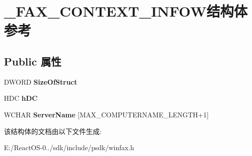 \hypertarget{struct___f_a_x___c_o_n_t_e_x_t___i_n_f_o_w}{}\section{\+\_\+\+F\+A\+X\+\_\+\+C\+O\+N\+T\+E\+X\+T\+\_\+\+I\+N\+F\+O\+W结构体 参考}
\label{struct___f_a_x___c_o_n_t_e_x_t___i_n_f_o_w}
\subsection*{Public 属性}
\begin{DoxyCompactItemize}
\item 
\mbox{\label{struct___f_a_x___c_o_n_t_e_x_t___i_n_f_o_w_aa58d932e8917d8bbe79fe3585bdc69f0}} 
D\+W\+O\+RD {\bfseries Size\+Of\+Struct}
\item 
\mbox{\label{struct___f_a_x___c_o_n_t_e_x_t___i_n_f_o_w_abdd87cba93df91e27694d1956846c2a6}} 
H\+DC {\bfseries h\+DC}
\item 
\mbox{\label{struct___f_a_x___c_o_n_t_e_x_t___i_n_f_o_w_a10fe4916ba711e5f9c926cdbfc0e6cc3}} 
W\+C\+H\+AR {\bfseries Server\+Name} \mbox{[}M\+A\+X\+\_\+\+C\+O\+M\+P\+U\+T\+E\+R\+N\+A\+M\+E\+\_\+\+L\+E\+N\+G\+TH+1\mbox{]}
\end{DoxyCompactItemize}


该结构体的文档由以下文件生成\+:\begin{DoxyCompactItemize}
\item 
E\+:/\+React\+O\+S-\/0../sdk/include/psdk/winfax.\+h\end{DoxyCompactItemize}
